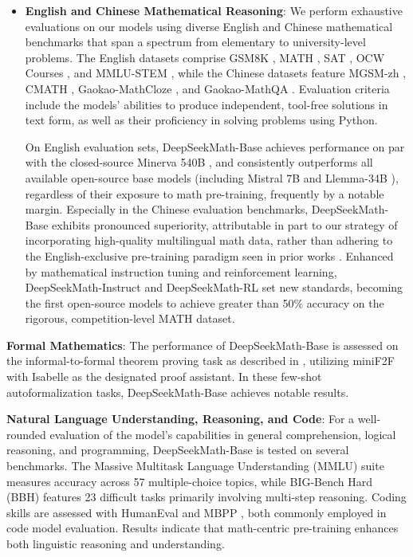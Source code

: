 \begin{itemize}[topsep=0pt]
    \item \textbf{English and Chinese Mathematical Reasoning}: We perform exhaustive evaluations on our models using diverse English and Chinese mathematical benchmarks that span a spectrum from elementary to university-level problems. The English datasets comprise GSM8K \citep{gsm8k}, MATH \citep{MATH}, SAT \citep{llemma}, OCW Courses \citep{minerva}, and MMLU-STEM \citep{mmlu}, while the Chinese datasets feature MGSM-zh \citep{mgsm}, CMATH \citep{wei2023cmath}, Gaokao-MathCloze \citep{agieval}, and Gaokao-MathQA \citep{agieval}. Evaluation criteria include the models’ abilities to produce independent, tool-free solutions in text form, as well as their proficiency in solving problems using Python.

    On English evaluation sets, DeepSeekMath-Base achieves performance on par with the closed-source Minerva 540B \citep{minerva}, and consistently outperforms all available open-source base models (including Mistral 7B \citep{mistral} and Llemma-34B \citep{llemma}), regardless of their exposure to math pre-training, frequently by a notable margin. Especially in the Chinese evaluation benchmarks, DeepSeekMath-Base exhibits pronounced superiority, attributable in part to our strategy of incorporating high-quality multilingual math data, rather than adhering to the English-exclusive pre-training paradigm seen in prior works \citep{minerva,llemma}. Enhanced by mathematical instruction tuning and reinforcement learning, DeepSeekMath-Instruct and DeepSeekMath-RL set new standards, becoming the first open-source models to achieve greater than 50\% accuracy on the rigorous, competition-level MATH dataset.
\end{itemize}

\item \textbf{Formal Mathematics}: The performance of DeepSeekMath-Base is assessed on the informal-to-formal theorem proving task as described in \citep{dsp_proof}, utilizing miniF2F \citep{minif2f} with Isabelle \citep{isabelle} as the designated proof assistant. In these few-shot autoformalization tasks, DeepSeekMath-Base achieves notable results.
\item \textbf{Natural Language Understanding, Reasoning, and Code}: For a well-rounded evaluation of the model's capabilities in general comprehension, logical reasoning, and programming, DeepSeekMath-Base is tested on several benchmarks. The Massive Multitask Language Understanding (MMLU) suite \citep{mmlu} measures accuracy across 57 multiple-choice topics, while BIG-Bench Hard (BBH) \citep{bbh} features 23 difficult tasks primarily involving multi-step reasoning. Coding skills are assessed with HumanEval \citep{codex} and MBPP \citep{mbpp}, both commonly employed in code model evaluation. Results indicate that math-centric pre-training enhances both linguistic reasoning and understanding.

